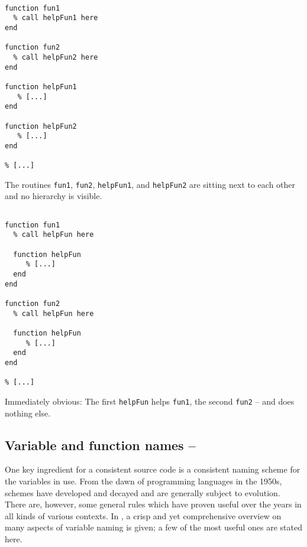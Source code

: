 \hfill
\begin{minipage}[t]{.45\textwidth}
\begin{lstlisting}[framerule=2pt,rulecolor=\color{badred}]
% [...]

function fun1
  % call helpFun1 here
end

function fun2
  % call helpFun2 here
end

function helpFun1
   % [...]
end

function helpFun2
   % [...]
end

% [...]
\end{lstlisting}
The routines \lstinline!fun1!, \lstinline!fun2!, \lstinline!helpFun1!, and \lstinline!helpFun2! are sitting next to each other and no hierarchy is visible.
\end{minipage}
\hfill
\begin{minipage}[t]{.45\textwidth}
\begin{lstlisting}[framerule=2pt,rulecolor=\color{goodgreen}]
% [...]

function fun1
  % call helpFun here

  function helpFun
     % [...]
  end
end

function fun2
  % call helpFun here

  function helpFun
     % [...]
  end
end

% [...]
\end{lstlisting}
Immediately obvious: The first \lstinline!helpFun! helps \lstinline!fun1!, the
second \lstinline!fun2! -- and does nothing else.
\end{minipage}
\hfill

%




\subsection{Variable and function names -- \cleansymbol\cleansymbol\cleansymbol}

One key ingredient for a consistent source code is a consistent naming scheme
for the variables in use. From the dawn of programming languages in the 1950s,
schemes have developed and decayed and are generally subject to evolution.
There are, however, some general rules which have proven useful over the years
in all kinds of various contexts. In \cite{Johnson:2002:MPS}, a crisp and yet
comprehensive overview on many aspects of variable naming is given; a few of
the most useful ones are stated here.

